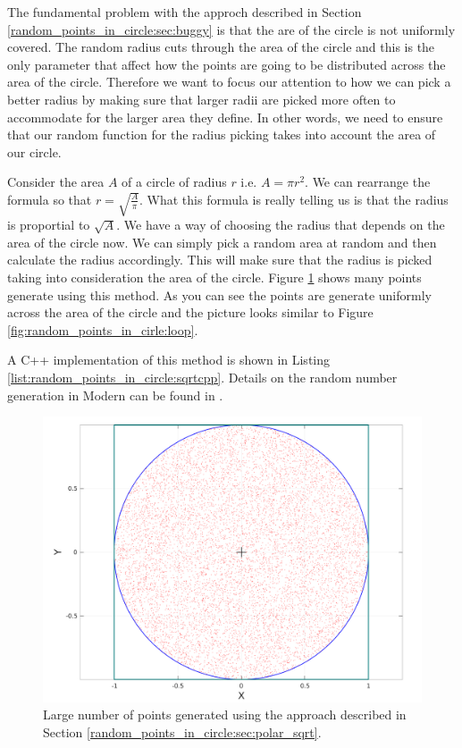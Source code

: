 The fundamental problem with the approch described in Section \ref{random_points_in_circle:sec:buggy} is that the are of the circle is not uniformly covered. The random radius cuts through the area of the circle and this is the only parameter that affect how the points are going to be distributed across the area of the circle. Therefore we want to focus our attention to  how we can  pick a better radius by making sure that larger radii are picked more often to accommodate for the larger area they define. In other words, we need to ensure that our random function for the radius picking takes into account the area of our circle. 

Consider the area $A$ of a circle of radius $r$ i.e.  $A = \pi r^2$. We can rearrange the formula so that $r = \sqrt{\frac{A}{\pi}}$. What this formula is really telling us is that the radius is proportial to $\sqrt{A}$. We have a way of choosing the radius that depends on the area of the circle now. We can simply pick a random area at  random and then calculate the radius accordingly. This will make sure that the radius is picked taking into consideration the area of the circle. Figure \ref{fig:random_points_in_cirle:polar_sqrt} shows many points generate using this method. As you can see the points are generate uniformly across the area of the circle and the picture looks similar to Figure \ref{fig:random_points_in_cirle:loop}.

A C++ implementation of this method is shown in Listing \ref{list:random_points_in_circle:sqrtcpp}. Details on the random number generation in Modern \CC can be found in \cite{cit::std::random}.



\begin{figure}
	\label{fig:random_points_in_cirle:polar_sqrt}
	\centering
	\includegraphics[scale=0.3]{sources/random_points_in_circle/images/sqrt_points}
	\caption{Large number of points generated using the approach described in Section \ref{random_points_in_circle:sec:polar_sqrt}.}
\end{figure}

